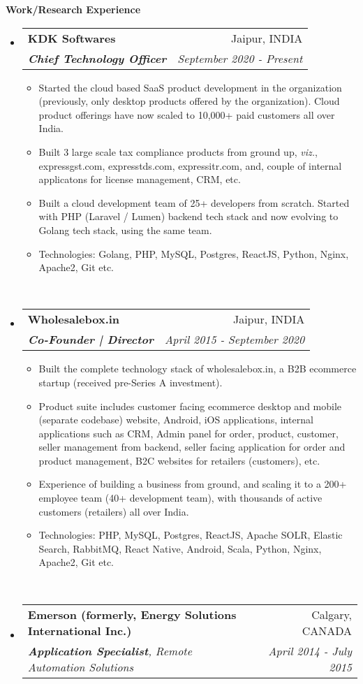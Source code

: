 \documentclass[letterpaper,11pt]{article}
\makeatletter
\newcommand{\resitem}[1]{\item #1 \vspace{-2pt}}
\newcommand{\resheading}[1]{{\large \colorbox{mygrey}{\begin{minipage}{\textwidth}{\textbf{#1 \vphantom{p\^{E}}}}\end{minipage}}}}
\newcommand{\ressubheading}[4]{
\begin{tabular*}{7.0in}{l@{\extracolsep{\fill}}r}
		\textbf{#1} & #2 \\
		\textit{#3} & \textit{#4} \\
\end{tabular*}\vspace{-6pt}}
\makeatother
\begin{document}
\resheading{Work/Research Experience}
\begin{itemize}
	\item
	\ressubheading{KDK Softwares }{Jaipur, INDIA}{\textbf{Chief Technology Officer}}{September 2020 - Present}
	\begin{itemize}
	  \resitem{Started the cloud based SaaS product development in the organization (previously, only desktop products offered by the organization). Cloud product offerings have now scaled to 10,000+ paid customers all over India.}
	  \resitem{Built 3 large scale tax compliance products from ground up, \textit{viz.}, expressgst.com, expresstds.com, expressitr.com, and, couple of internal applicatons for license management, CRM, etc.}
	  \resitem{Built a cloud development team of 25+ developers from scratch. Started with PHP (Laravel / Lumen) backend tech stack and now evolving to Golang tech stack, using the same team.}
	  \resitem{Technologies: Golang, PHP, MySQL, Postgres, ReactJS, Python, Nginx, Apache2, Git etc. }
	\end{itemize} ~\\ \vspace{-10pt}
	\item
	      \ressubheading{Wholesalebox.in }{Jaipur, INDIA}{\textbf{Co-Founder | Director}}{April 2015 - September 2020}
	      \begin{itemize}
			\resitem{Built the complete technology stack of wholesalebox.in, a B2B ecommerce startup (received pre-Series A investment).}
			\resitem{Product suite includes customer facing ecommerce desktop and mobile (separate codebase) website, Android, iOS applications, internal applications such as CRM, Admin panel for order, product, customer, seller management from backend, seller facing application for order and product management, B2C websites for retailers (customers), etc.}
			\resitem{Experience of building a business from ground, and scaling it to a 200+ employee team (40+ development team), with thousands of active customers (retailers) all over India.}
			\resitem{Technologies: PHP, MySQL, Postgres, ReactJS, Apache SOLR, Elastic Search, RabbitMQ, React Native, Android, Scala, Python, Nginx, Apache2, Git etc. }
	      \end{itemize} ~\\ \vspace{-10pt}
	\item
	      \ressubheading{Emerson (formerly, Energy Solutions International Inc.) }{Calgary, CANADA}{\textbf{Application Specialist}, Remote Automation Solutions}{April 2014 - July 2015}

\end{itemize}
\end{document}

